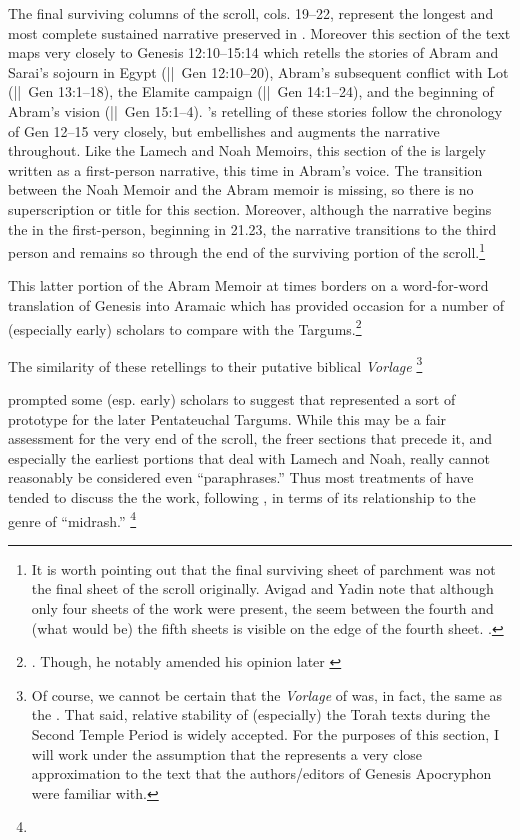 The final surviving columns of the scroll, cols. 19--22, represent the longest and most complete sustained narrative preserved in \ga. Moreover this section of the text maps very closely to Genesis 12:10--15:14 which retells the stories of Abram and Sarai's sojourn in Egypt (||~Gen 12:10--20), Abram's subsequent conflict with Lot (||~Gen 13:1--18), the Elamite campaign (||~Gen 14:1--24), and the beginning of Abram's vision (||~Gen 15:1--4). \ga's retelling of these stories follow the chronology of Gen 12--15 very closely, but \ga embellishes and augments the narrative throughout. Like the Lamech and Noah Memoirs, this section of the \ga is largely written as a first-person narrative, this time in Abram's voice. The transition between the Noah Memoir and the Abram memoir is missing, so there is no superscription or title for this section. Moreover, although the narrative begins the in the first-person, beginning in 21.23, the narrative transitions to the third person and remains so through the end of the surviving portion of the scroll.\footnote{It is worth pointing out that the final surviving sheet of parchment was not the final sheet of the scroll originally. Avigad and Yadin note that although only four sheets of the work were present, the seem between the fourth and (what would be) the fifth sheets is visible on the edge of the fourth sheet. \cite*[14]{avigad-yadin1956}.}

This latter portion of the Abram Memoir at times borders on a word-for-word translation of Genesis into Aramaic which has provided occasion for a number of (especially early) scholars to compare \ga with the Targums.\footnote{\cite[193]{black1983}. Though, he notably amended his opinion later \cite*{BLACK::TODO}}

The similarity of these retellings to their putative biblical \emph{Vorlage}%
\footnote{Of course, we cannot be certain that the \emph{Vorlage} of \ga was, in fact, the same as the \mt. That said, relative stability of (especially) the Torah texts during the Second Temple Period is widely accepted. For the purposes of this section, I will work under the assumption that the \mt represents a very close approximation to the text that the authors/editors of Genesis Apocryphon were familiar with.}

prompted some (esp. early) scholars to suggest that \ga represented a sort of prototype for the later Pentateuchal Targums.\autocite[193]{black1983} While this may be a fair assessment for the very end of the scroll, the freer sections that precede it, and especially the earliest portions that deal with Lamech and Noah, really cannot reasonably be considered even ``paraphrases.'' Thus most treatments of \ga have tended to discuss the the work, following \vermes, in terms of its relationship to the genre of ``midrash.''\autocite{vermes1961}%
%
\footnote{}

